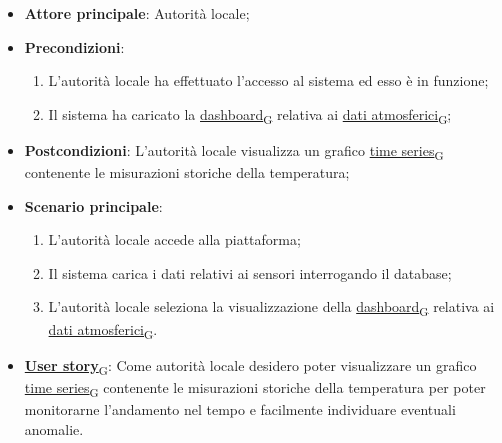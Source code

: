 \begin{itemize}
	\item \textbf{Attore principale}: Autorità locale;
	\item \textbf{Precondizioni}:
	      \begin{enumerate}
		      \item L'autorità locale ha effettuato l'accesso al sistema ed esso è in funzione;
		      \item Il sistema ha caricato la \href{https://7last.github.io/docs/rtb/documentazione-interna/glossario\#dashboard}{dashboard\textsubscript{G}} relativa ai \href{https://7last.github.io/docs/rtb/documentazione-interna/glossario\#dati-atmosferici}{dati atmosferici\textsubscript{G}};
	      \end{enumerate}


	\item \textbf{Postcondizioni}: L'autorità locale visualizza un grafico \href{https://7last.github.io/docs/rtb/documentazione-interna/glossario\#time-series}{time series\textsubscript{G}} contenente le misurazioni storiche
	      della temperatura;
	\item \textbf{Scenario principale}:
	      \begin{enumerate}
		      \item L'autorità locale accede alla piattaforma;
		      \item Il sistema carica i dati relativi ai sensori interrogando il database;
		      \item L'autorità locale seleziona la visualizzazione della \href{https://7last.github.io/docs/rtb/documentazione-interna/glossario\#dashboard}{dashboard\textsubscript{G}} relativa ai \href{https://7last.github.io/docs/rtb/documentazione-interna/glossario\#dati-atmosferici}{dati atmosferici\textsubscript{G}}.
	      \end{enumerate}
	\item \href{https://7last.github.io/docs/rtb/documentazione-interna/glossario\#user-story}{\textbf{User story}\textsubscript{G}}: Come autorità locale desidero poter visualizzare un grafico \href{https://7last.github.io/docs/rtb/documentazione-interna/glossario\#time-series}{time series\textsubscript{G}} contenente le misurazioni storiche della temperatura
	      per poter monitorarne l'andamento nel tempo e facilmente individuare eventuali anomalie.
\end{itemize}


